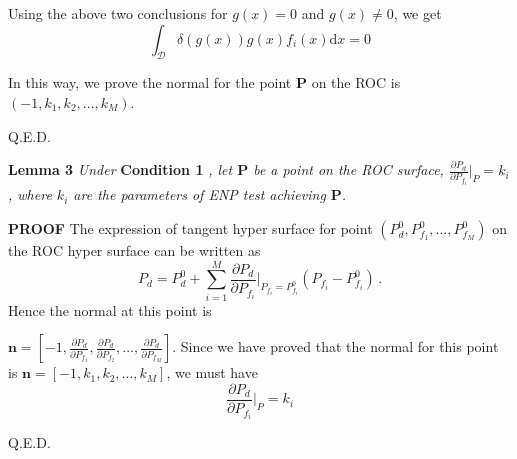 Using the above two conclusions for $g(x) = 0$ and $g(x) \neq 0$, we get
\begin{equation}
\int_{\mathcal{D}} \delta (g(x)) g(x)f_i(x) \mathrm{d}x = 0
\end{equation}

In this way, we prove the normal for the point \textbf{P} on the ROC is $(-1, k_1, k_2, ..., k_M)$.

Q.E.D.

\noindent \textbf{Lemma 3}
\textit{
\noindent
Under}
\textbf{Condition 1}
\textit{, let $\mathbf{P}$ be a point on the ROC surface, $\frac{\partial P_d}{\partial P_{f_i}} \bigg|_P = k_i$, where $k_i$ are the parameters of ENP test achieving $\mathbf{P}$.
}

\noindent\textbf{PROOF}
The expression of tangent hyper surface for point $(P_d^0, P_{f_1}^0, ..., P_{f_M}^0)$ on the ROC hyper surface can be written as
\begin{equation}
P_d = P_d^0 + \sum_{i=1}^{M} \frac{\partial P_d}{\partial P_{f_i}}\bigg|_{P_{f_i} = P_{f_i}^0}(P_{f_i} - P_{f_i}^0)\,.
\end{equation}
Hence the normal at this point is

 $\mathbf{n} = [-1, \frac{\partial P_d}{\partial P_{f_1}}, \frac{\partial P_d}{\partial P_{f_2}}, ..., \frac{\partial P_d}{\partial P_{f_M}}]$. Since we have proved that  the normal for this point is $\mathbf{n} = [-1, k_1, k_2, ..., k_M]$, we must have
\begin{equation}
\frac{\partial P_d}{\partial P_{f_i}}\bigg|_{P} = k_i
\end{equation}

Q.E.D.
